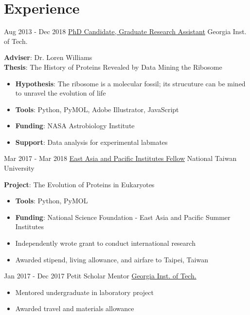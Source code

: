 \documentclass[letterpaper]{twentysecondcv}
\begin{document}
\section{Experience}
\begin{twenty}
	\twentyitem
    	{Aug 2013 -}
		{Dec 2018}
        {\href{https://ww2.chemistry.gatech.edu/~lw26/}{PhD Candidate, Graduate Research Assistant}}
        {Georgia Inst. of Tech.}
        {}
        {
        \textbf{Adviser}: Dr. Loren Williams \\ 
        \textbf{Thesis}: The History of Proteins Revealed by Data Mining the Ribosome
        {\begin{itemize}
        \item \textbf{Hypothesis}: The ribosome is a molecular fossil; its strucuture can be mined to unravel the evolution of life 
        \item \textbf{Tools}: Python, PyMOL, Adobe Illustrator, JavaScript
        \item \textbf{Funding}: NASA Astrobiology Institute
        \item \textbf{Support}: Data analysis for experimental labmates
 \vspace{4mm}
		\end{itemize}}
        }

	\twentyitem
    	{Mar 2017 -}
		{Mar 2018}
        {\href{https://www.nsf.gov/funding/pgm_summ.jsp?pims_id=5284}{East Asia and Pacific Institutes Fellow}}
        {National Taiwan University}
        {}
        {
\vspace{-3mm}
		\textbf{Project}: The Evolution of Proteins in Eukaryotes
        {\begin{itemize}
        \item \textbf{Tools}: Python, PyMOL
        \item \textbf{Funding}: National Science Foundation \scriptsize{- East Asia and Pacific Summer Institutes}
        \item \normalsize{Independently wrote grant to conduct international research}
        \item Awarded stipend, living allowance, and airfare to Taipei, Taiwan
 \vspace{4mm}
		\end{itemize}}
        }

	\twentyitem
    	{Jan 2017 -}
		{Dec 2017}
        {Petit Scholar Mentor}
        {\href{http://petitinstitute.gatech.edu/become-petit-scholar-mentor}{Georgia Inst. of Tech.}}
        {}
        {
\vspace{-3mm}
        {\begin{itemize}
        \item Mentored undergraduate in laboratory project
        \item Awarded travel and materials allowance
 \vspace{4mm}
		\end{itemize}}
        }


\end{twenty}
\end{document}
